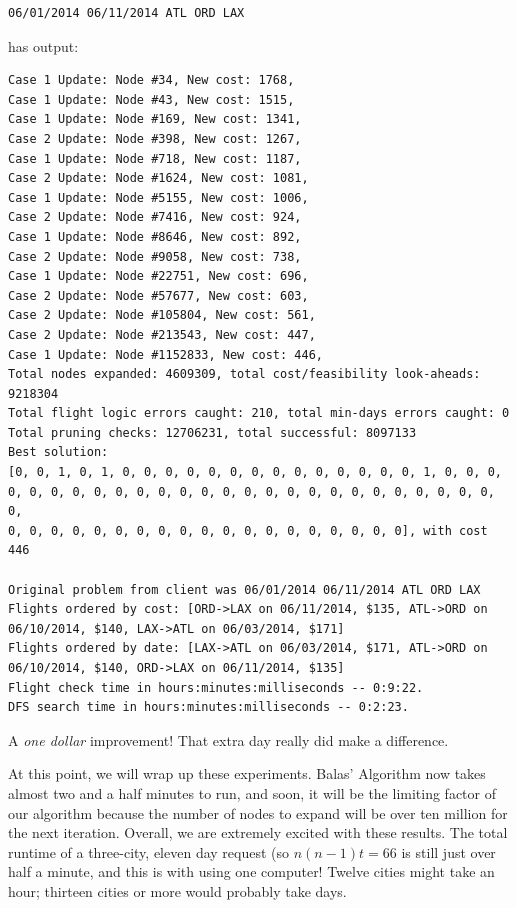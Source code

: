 \documentclass{article}
\begin{document}
\begin{verbatim}
06/01/2014 06/11/2014 ATL ORD LAX
\end{verbatim}

has output:

\scriptsize
\begin{verbatim}
Case 1 Update: Node #34, New cost: 1768, 
Case 1 Update: Node #43, New cost: 1515, 
Case 1 Update: Node #169, New cost: 1341, 
Case 2 Update: Node #398, New cost: 1267, 
Case 1 Update: Node #718, New cost: 1187, 
Case 2 Update: Node #1624, New cost: 1081, 
Case 1 Update: Node #5155, New cost: 1006, 
Case 2 Update: Node #7416, New cost: 924, 
Case 1 Update: Node #8646, New cost: 892, 
Case 2 Update: Node #9058, New cost: 738, 
Case 1 Update: Node #22751, New cost: 696, 
Case 2 Update: Node #57677, New cost: 603, 
Case 2 Update: Node #105804, New cost: 561, 
Case 2 Update: Node #213543, New cost: 447, 
Case 1 Update: Node #1152833, New cost: 446, 
Total nodes expanded: 4609309, total cost/feasibility look-aheads: 9218304
Total flight logic errors caught: 210, total min-days errors caught: 0
Total pruning checks: 12706231, total successful: 8097133
Best solution:
[0, 0, 1, 0, 1, 0, 0, 0, 0, 0, 0, 0, 0, 0, 0, 0, 0, 0, 0, 1, 0, 0, 0,
0, 0, 0, 0, 0, 0, 0, 0, 0, 0, 0, 0, 0, 0, 0, 0, 0, 0, 0, 0, 0, 0, 0, 0,
0, 0, 0, 0, 0, 0, 0, 0, 0, 0, 0, 0, 0, 0, 0, 0, 0, 0, 0], with cost 446

Original problem from client was 06/01/2014 06/11/2014 ATL ORD LAX
Flights ordered by cost: [ORD->LAX on 06/11/2014, $135, ATL->ORD on 06/10/2014, $140, LAX->ATL on 06/03/2014, $171]
Flights ordered by date: [LAX->ATL on 06/03/2014, $171, ATL->ORD on 06/10/2014, $140, ORD->LAX on 06/11/2014, $135]
Flight check time in hours:minutes:milliseconds -- 0:9:22.
DFS search time in hours:minutes:milliseconds -- 0:2:23.
\end{verbatim}
\normalsize

A \emph{one dollar} improvement! That extra day really did make a difference.

At this point, we will wrap up these experiments. Balas' Algorithm now takes almost two and a half minutes to run, and soon, it will be the limiting
factor of our algorithm because the number of nodes to expand will be over ten million for the next iteration. Overall, we are extremely excited with
these results.  The total runtime of a three-city, eleven day request (so $n(n-1)t = 66$ is still just over half a minute, and this is with using one
computer! Twelve cities might take an hour; thirteen cities or more would probably take days.
\end{document}
